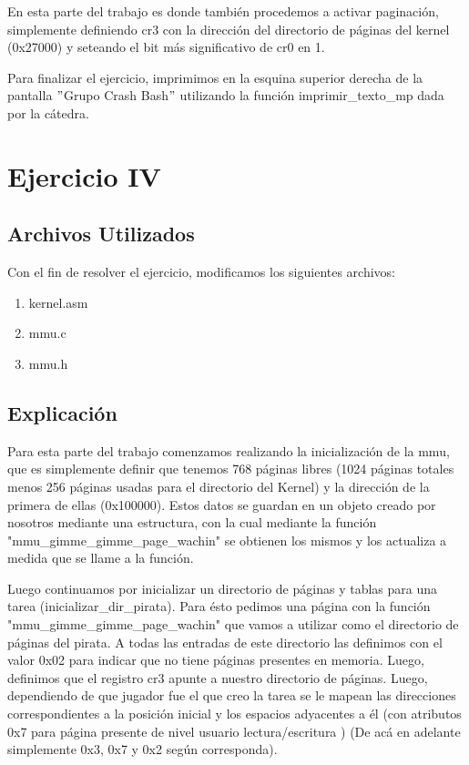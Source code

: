 \documentclass[a4paper]{article}
\begin{document}
En esta parte del trabajo es donde también procedemos a activar paginación, simplemente definiendo cr3 con la dirección del directorio de páginas del kernel (0x27000) y seteando el bit más significativo de cr0 en 1.

Para finalizar el ejercicio, imprimimos en la esquina superior derecha de la pantalla $"$Grupo Crash Bash$"$ utilizando la función imprimir_texto_mp dada por la cátedra.


\newpage

\section{Ejercicio IV}
\subsection{Archivos Utilizados}

Con el fin de resolver el ejercicio, modificamos los siguientes archivos:

\begin{enumerate}

\item kernel.asm
\item mmu.c
\item mmu.h

\end{enumerate}


\subsection{Explicación}


Para esta parte del trabajo comenzamos realizando la inicialización de la mmu, que es simplemente definir que tenemos 768 páginas libres (1024 páginas totales menos 256 páginas usadas para el directorio del Kernel) y la dirección de la primera de ellas (0x100000). Estos datos se guardan en un objeto creado por nosotros mediante una estructura, con la cual mediante la función "mmu_gimme_gimme_page_wachin" se obtienen los mismos y los actualiza a medida que se llame a la función.

Luego continuamos por inicializar un directorio de páginas y tablas para una tarea (inicializar_dir_pirata). Para ésto pedimos una página con la función "mmu_gimme_gimme_page_wachin" que vamos a utilizar como el directorio de páginas del pirata. A todas las entradas de este directorio las definimos con el valor 0x02 para indicar que no tiene páginas presentes en memoria. Luego, definimos que el registro cr3 apunte a nuestro directorio de páginas. Luego, dependiendo de que jugador fue el que creo la tarea se le mapean las direcciones correspondientes a la posición inicial y los espacios adyacentes a él (con atributos 0x7 para página presente de nivel usuario lectura/escritura ) (De acá en adelante simplemente 0x3, 0x7 y 0x2 según corresponda).
\end{document}
